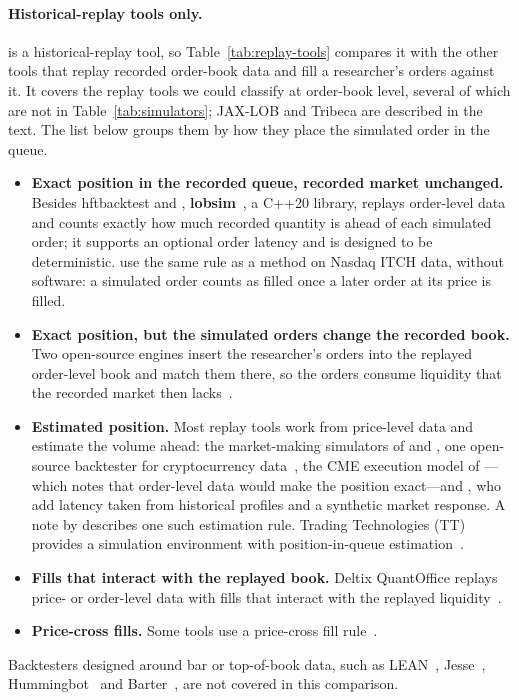 \paragraph{Historical-replay tools only.} \kasparhft{} is a historical-replay tool, so Table~\ref{tab:replay-tools}
compares it with the other tools that replay recorded order-book data and fill a researcher's orders against it. It
covers the replay tools we could classify at order-book level, several of which are not in
Table~\ref{tab:simulators}; JAX-LOB and Tribeca are described in the text. The list below groups them by how they place the simulated order in the queue.
\begin{itemize}[leftmargin=1.5em,itemsep=1pt]
\item \textbf{Exact position in the recorded queue, recorded market unchanged.} Besides hftbacktest and \kasparhft{},
  \textbf{lobsim}~\citep{lobsim}, a C++20 library, replays order-level data and counts exactly how much recorded
  quantity is ahead of each simulated order; it supports an optional order latency and is designed to be deterministic. \citet{moallemi2017} use the same rule as a method on Nasdaq ITCH data, without software: a
  simulated order counts as filled once a later order at its price is filled.
\item \textbf{Exact position, but the simulated orders change the recorded book.} Two open-source engines insert the
  researcher's orders into the replayed order-level book and match them there, so the orders consume liquidity that
  the recorded market then lacks~\citep{chasemetoyer_bte,koteyevlev_mm}.
\item \textbf{Estimated position.} Most replay tools work from price-level data and estimate the volume ahead:
  the market-making simulators of \citet{spooner2018} and \citet{sadighian2019}, one open-source backtester for
  cryptocurrency data~\citep{evgerher_hft}, the CME execution model of \citet{dixon2018exec}---which notes that
  order-level data would make the position exact---and \citet{vyetrenko2019}, who add latency taken from historical
  profiles and a synthetic market response. A note by \citet{rigtorp2013queue} describes one such
  estimation rule. Trading Technologies (TT) provides a simulation environment with position-in-queue
  estimation~\citep{tt_piq,tt_sim_env}.
\item \textbf{Fills that interact with the replayed book.} Deltix QuantOffice replays price- or order-level data with
  fills that interact with the replayed liquidity~\citep{deltix_exsim,deltix_qo_sheet}.
\item \textbf{Price-cross fills.} Some tools use a price-cross fill rule~\citep{tribeca}.
\end{itemize}
Backtesters designed around bar or top-of-book data, such as LEAN~\citep{lean}, Jesse~\citep{jesse},
Hummingbot~\citep{hummingbot} and Barter~\citep{barter}, are not covered in this comparison.

